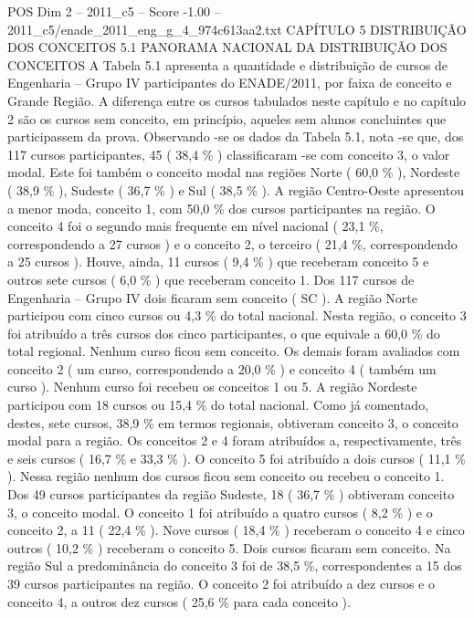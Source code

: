 \begin{textsample}{POS Dim 2 – 2011\_c5 – Score -1.00 – 2011\_c5/enade\_2011\_eng\_g\_4\_974c613aa2.txt}  \label{ex:f2_pos_346}
CAPÍTULO 5 DISTRIBUIÇÃO DOS CONCEITOS 5.1 PANORAMA NACIONAL DA DISTRIBUIÇÃO DOS CONCEITOS A Tabela 5.1 apresenta a quantidade e distribuição de cursos de Engenharia – Grupo IV participantes do ENADE/2011, por faixa de conceito e Grande Região.
A diferença entre os cursos tabulados neste capítulo e no capítulo 2 são os cursos sem conceito, em princípio, aqueles sem alunos concluintes que participassem da prova.
Observando -se os dados da Tabela 5.1, nota -se que, dos 117 cursos participantes, 45 ( 38,4 \% ) classificaram -se com conceito 3, o valor modal.
Este foi também o conceito modal nas regiões Norte ( 60,0 \% ), Nordeste ( 38,9 \% ), Sudeste ( 36,7 \% ) e Sul ( 38,5 \% ).
A região Centro-Oeste apresentou a menor moda, conceito 1, com 50,0 \% dos cursos participantes na região.
O conceito 4 foi o segundo mais frequente em nível nacional ( 23,1 \%, correspondendo a 27 cursos ) e o conceito 2, o terceiro ( 21,4 \%, correspondendo a 25 cursos ).
Houve, ainda, 11 cursos ( 9,4 \% ) que receberam conceito 5 e outros sete cursos ( 6,0 \% ) que receberam conceito 1.
Dos 117 cursos de Engenharia – Grupo IV dois ficaram sem conceito ( SC ).
A região Norte participou com cinco cursos ou 4,3 \% do total nacional.
Nesta região, o conceito 3 foi atribuído a três cursos dos cinco participantes, o que equivale a 60,0 \% do total regional.
Nenhum curso ficou sem conceito.
Os demais foram avaliados com conceito 2 ( um curso, correspondendo a 20,0 \% ) e conceito 4 ( também um curso ).
Nenhum curso foi recebeu os conceitos 1 ou 5.
A região Nordeste participou com 18 cursos ou 15,4 \% do total nacional.
Como já comentado, destes, sete cursos, 38,9 \% em termos regionais, obtiveram conceito 3, o conceito modal para a região.
Os conceitos 2 e 4 foram atribuídos a, respectivamente, três e seis cursos ( 16,7 \% e 33,3 \% ).
O conceito 5 foi atribuído a dois cursos ( 11,1 \% ).
Nessa região nenhum dos cursos ficou sem conceito ou recebeu o conceito 1.
Dos 49 cursos participantes da região Sudeste, 18 ( 36,7 \% ) obtiveram conceito 3, o conceito modal.
O conceito 1 foi atribuído a quatro cursos ( 8,2 \% ) e o conceito 2, a 11 ( 22,4 \% ).
Nove cursos ( 18,4 \% ) receberam o conceito 4 e cinco outros ( 10,2 \% ) receberam o conceito 5.
Dois cursos ficaram sem conceito.
Na região Sul a predominância do conceito 3 foi de 38,5 \%, correspondentes a 15 dos 39 cursos participantes na região.
O conceito 2 foi atribuído a dez cursos e o conceito 4, a outros dez cursos ( 25,6 \% para cada conceito ).

\end{textsample}
